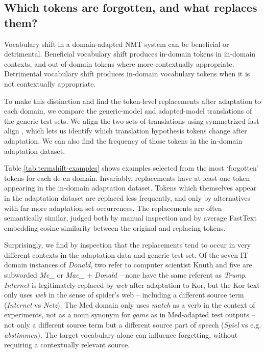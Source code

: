 \documentclass[11pt]{article}
\begin{document}
\subsection{Which tokens are forgotten, and what replaces them?}
\label{sec:whatforgot}

Vocabulary shift in a domain-adapted NMT system can be beneficial or detrimental. Beneficial vocabulary shift produces in-domain tokens in in-domain contexts, and out-of-domain tokens where more contextually appropriate. Detrimental vocabulary shift produces in-domain vocabulary tokens when it is not contextually appropriate.%



To make this distinction and find the token-level replacements after adaptation to each domain, we compare the generic-model and adapted-model translations of the generic test sets. We  align the two sets of translations using symmetrized fast align \cite{dyer-etal-2013-simple}, which lets us identify which translation hypothesis tokens change after adaptation. We can also find the frequency of those tokens in the in-domain adaptation dataset.

Table \ref{tab:termshift-examples} shows examples selected from the most `forgotten' tokens for each de-en domain. Invariably, replacements have at least one token appearing in the in-domain adaptation dataset. Tokens which themselves appear in the adaptation dataset are replaced less frequently, and only by alternatives with far more adaptation set occurrences. The replacements are often semantically similar, judged both by manual inspection and by average FastText embedding cosine similarity \cite{fasttextlibrary} between the original and replacing tokens.  

Surprisingly, we find by inspection that the replacements tend to occur in very different contexts in the adaptation data and generic test set. Of the seven IT domain instances of \emph{Donald}, two refer to computer scientist Knuth and five are subworded \emph{Mc\_} or \emph{Mac\_} + \emph{Donald} -- none have the same referent as \emph{Trump}. \emph{Internet} is legitimately replaced by \emph{web} after adaptation to Kor, but  the Kor text only uses \emph{web} in the sense of spider's web -- including a different source term (\emph{Internet} vs \emph{Netz}).  The Med domain only uses \emph{match} as a verb in the context of experiments, not as a noun synonym for \emph{game} as in Med-adapted test outputs -- not only a different source term but a different source part of speech (\emph{Spiel} vs e.g. \emph{abstimmen}). The target vocabulary alone can influence forgetting, without requiring a contextually relevant source.
\end{document}
